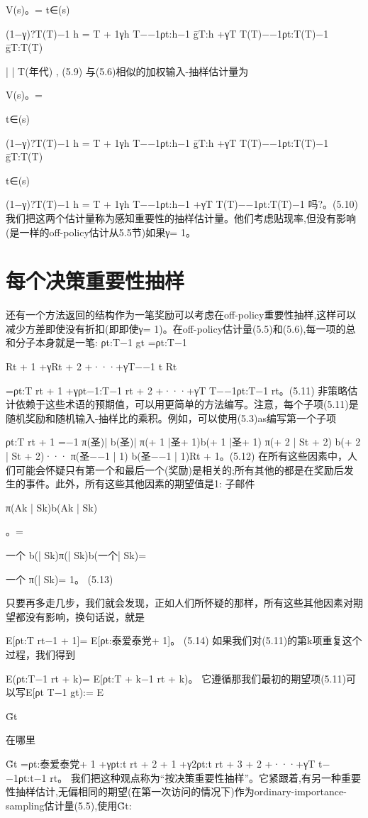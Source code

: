 V(s)。=	
t∈(s)

(1−γ)?T(T)−1 h = T + 1γh T−−1ρt:h−1 ḡT:h +γT T(T)−−1ρt:T(T)−1 ḡT:T(T)

| | T(年代) 					,	(5.9)
与(5.6)相似的加权输入-抽样估计量为


V(s)。=

t∈(s)

(1−γ)?T(T)−1 h = T + 1γh T−−1ρt:h−1 ḡT:h +γT T(T)−−1ρt:T(T)−1 ḡT:T(T)


t∈(s)

(1−γ)?T(T)−1 h = T + 1γh T−−1ρt:h−1 +γT T(T)−−1ρt:T(T)−1
吗?。(5.10)
我们把这两个估计量称为感知重要性的抽样估计量。他们考虑贴现率,但没有影响(是一样的off-policy估计从5.5节)如果γ= 1。

\section{每个决策重要性抽样}
还有一个方法返回的结构作为一笔奖励可以考虑在off-policy重要性抽样,这样可以减少方差即使没有折扣(即即使γ= 1)。在off-policy估计量(5.5)和(5.6),每一项的总和分子本身就是一笔:
ρt:T−1 gt =ρt:T−1

Rt + 1 +γRt + 2 +···+γT−−1 t Rt

=ρt:T rt + 1 +γρt−1:T−1 rt + 2 +···+γT T−−1ρt:T−1 rt。(5.11)
非策略估计依赖于这些术语的预期值，可以用更简单的方法编写。注意，每个子项(5.11)是随机奖励和随机输入-抽样比的乘积。例如，可以使用(5.3)as编写第一个子项

ρt:T rt + 1 =−1
π(圣)| b(圣)|
π(+ 1 |圣+ 1)b(+ 1 |圣+ 1)
π(+ 2 | St + 2)
b(+ 2 | St + 2)···
π(圣−−1 | 1)
b(圣−−1 | 1)Rt + 1。(5.12)
在所有这些因素中，人们可能会怀疑只有第一个和最后一个(奖励)是相关的;所有其他的都是在奖励后发生的事件。此外，所有这些其他因素的期望值是1:
子邮件

π(Ak | Sk)b(Ak | Sk)

。=

一个
b(| Sk)π(| Sk)b(一个| Sk)=

一个
π(| Sk)= 1。 					(5.13)

只要再多走几步，我们就会发现，正如人们所怀疑的那样，所有这些其他因素对期望都没有影响，换句话说，就是

E[ρt:T rt−1 + 1]= E[ρt:泰爱泰党+ 1]。 					(5.14)
如果我们对(5.11)的第k项重复这个过程，我们得到

E(ρt:T−1 rt + k)= E[ρt:T + k−1 rt + k)。
它遵循那我们最初的期望项(5.11)可以写E[ρt T−1 gt):= E

G̃t

在哪里

G̃t =ρt:泰爱泰党+ 1 +γρt:t rt + 2 + 1 +γ2ρt:t rt + 3 + 2 +···+γT t−−1ρt:t−1 rt。
我们把这种观点称为“按决策重要性抽样”。它紧跟着,有另一种重要性抽样估计,无偏相同的期望(在第一次访问的情况下)作为ordinary-importance-sampling估计量(5.5),使用G̃t:

